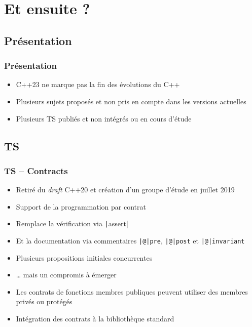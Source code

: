\documentclass[C++.tex]{subfiles}
\begin{document}
\section{Et ensuite ?}
\subsection*{Présentation}
\begin{frame}[fragile]
	\frametitle{Présentation}
	\begin{itemize}
		\item C++23 ne marque pas la fin des évolutions du C++
		\item Plusieurs sujets proposés et non pris en compte dans les versions actuelles
		\item Plusieurs TS publiés et non intégrés ou en cours d'étude
	\end{itemize}
\end{frame}

\subsection*{TS}
\begin{frame}[fragile]
	\frametitle{TS -- Contracts}
	\begin{itemize}
		\item Retiré du \textit{draft} C++20 et création d'un groupe d'étude en juillet 2019
		\item Support de la programmation par contrat
		\item Remplace la vérification via \texttt|assert| 
		\item Et la documentation via commentaires \texttt{|@|pre}, \texttt{|@|post} et \texttt{|@|invariant}
		\item Plusieurs propositions initiales concurrentes
		\item \ldots{} mais un compromis à émerger
		\item Les contrats de fonctions membres publiques peuvent utiliser des membres privés ou protégés
		\item Intégration des contrats à la bibliothèque standard
	\end{itemize}
\end{frame}
\end{document}
